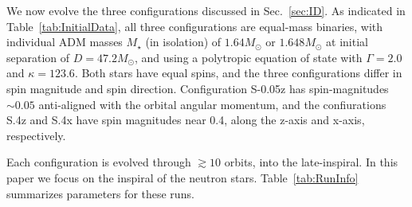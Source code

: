 \documentclass[aps,prd,amsmath,floatfix
,twocolumn
,superscriptaddress,nofootinbib,showpacs]{revtex4-1}
\theoremstyle{plain} \newtheorem{thm}{Theorem} \newtheorem{lem}{Lemma}
\newcommand{\roland}[1]{\textcolor{Magenta}{\textit{ROLAND: #1}}}
\begin{document}

We now evolve the three configurations discussed in Sec.~\ref{sec:ID}.
As indicated in Table~\ref{tab:InitialData}, all three configurations
are equal-mass binaries, with individual ADM masses $M_\star$ (in
isolation) 
of $1.64M_{\odot}$ or $1.648M_{\odot}$ at initial
separation of $D=47.2M_\odot$, and using a polytropic equation of
state with $\Gamma=2.0$ and $\kappa=123.6$.  Both stars have equal
spins, and the three configurations differ in spin magnitude and spin
direction.  Configuration S-0.05z has spin-magnitudes $\sim 0.05$
anti-aligned with the orbital angular momentum, and the confiurations
S.4z and S.4x have spin magnitudes near 0.4, along the z-axis and
x-axis, respectively.




Each configuration is evolved through $\gtrsim 10$ orbits, into the
late-inspiral.  In this paper we focus on the inspiral of the neutron
stars.  Table~\ref{tab:RunInfo} summarizes parameters for these runs.
\end{document}
